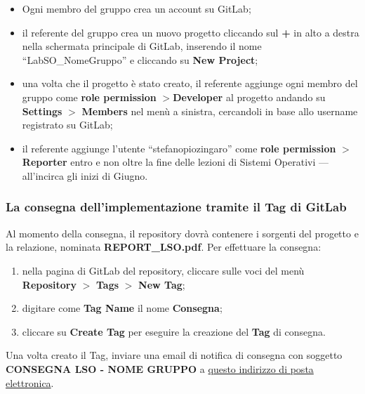 \begin{tcolorbox}[colback=blue!20!white,colframe=blue!75!black,title=GitLab]
 \begin{itemize}
  \item Ogni membro del gruppo crea un account su GitLab;
  \item il referente del gruppo  crea un nuovo progetto cliccando sul \textbf{+} in alto a destra nella schermata principale di GitLab, inserendo il nome ``LabSO\_NomeGruppo'' e cliccando su \textbf{New Project};
  \item una volta che il progetto è stato creato, il referente aggiunge ogni membro del gruppo come \textbf{role permission} $>$\textbf{Developer} al progetto andando su \textbf{Settings} $>$ \textbf{Members} nel menù a sinistra, cercandoli in base allo username registrato su GitLab;
  \item il referente aggiunge l'utente ``stefanopiozingaro'' come \textbf{role permission} $>$ \textbf{Reporter} entro e non oltre la fine delle lezioni di Sistemi Operativi --- all'incirca gli inizi di Giugno.
 \end{itemize}
\end{tcolorbox}

\subsubsection{La consegna dell'implementazione tramite il Tag di GitLab}

Al momento della consegna, il repository dovrà contenere i sorgenti del progetto
e la relazione, nominata \textbf{REPORT\_LSO.pdf}. Per effettuare la consegna:

\begin{enumerate}

 \item nella pagina di GitLab del repository, cliccare sulle voci del menù
       \textbf{Repository} $>$ \textbf{Tags} $>$ \textbf{New Tag};

 \item digitare come \textbf{Tag Name} il nome \textbf{Consegna};

 \item cliccare su \textbf{Create Tag} per eseguire la creazione del
       \textbf{Tag} di consegna.

\end{enumerate}

Una volta creato il Tag, inviare una email di notifica di consegna con soggetto
\textbf{CONSEGNA LSO - NOME GRUPPO} a
\href{mailto:stefanopio.zingaro@unibo.it}{questo indirizzo di posta
 elettronica}.


